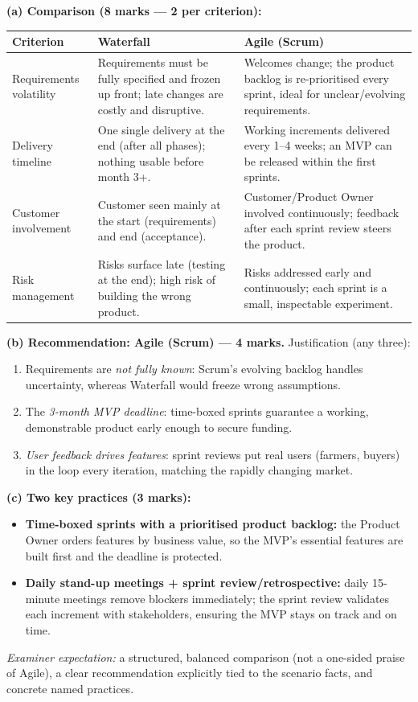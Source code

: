 \documentclass[11pt]{article}
\begin{document}
\begin{corrige}
\textbf{(a) Comparison (8 marks — 2 per criterion):}
\begin{center}
\begin{tabularx}{\linewidth}{|l|X|X|}\hline
\rowcolor{popblueL} \textbf{Criterion} & \textbf{Waterfall} & \textbf{Agile (Scrum)} \\ \hline
Requirements volatility & Requirements must be fully specified and frozen up front; late changes are costly and disruptive. & Welcomes change; the product backlog is re-prioritised every sprint, ideal for unclear/evolving requirements. \\ \hline
Delivery timeline & One single delivery at the end (after all phases); nothing usable before month 3+. & Working increments delivered every 1--4 weeks; an MVP can be released within the first sprints. \\ \hline
Customer involvement & Customer seen mainly at the start (requirements) and end (acceptance). & Customer/Product Owner involved continuously; feedback after each sprint review steers the product. \\ \hline
Risk management & Risks surface late (testing at the end); high risk of building the wrong product. & Risks addressed early and continuously; each sprint is a small, inspectable experiment. \\ \hline
\end{tabularx}
\end{center}

\textbf{(b) Recommendation: Agile (Scrum) — 4 marks.} Justification (any three):
\begin{enumerate}
    \item Requirements are \emph{not fully known}: Scrum's evolving backlog handles uncertainty, whereas Waterfall would freeze wrong assumptions.
    \item The \emph{3-month MVP deadline}: time-boxed sprints guarantee a working, demonstrable product early enough to secure funding.
    \item \emph{User feedback drives features}: sprint reviews put real users (farmers, buyers) in the loop every iteration, matching the rapidly changing market.
\end{enumerate}

\textbf{(c) Two key practices (3 marks):}
\begin{itemize}
    \item \textbf{Time-boxed sprints with a prioritised product backlog:} the Product Owner orders features by business value, so the MVP's essential features are built first and the deadline is protected.
    \item \textbf{Daily stand-up meetings + sprint review/retrospective:} daily 15-minute meetings remove blockers immediately; the sprint review validates each increment with stakeholders, ensuring the MVP stays on track and on time.
\end{itemize}
\emph{Examiner expectation:} a structured, balanced comparison (not a one-sided praise of Agile), a clear recommendation explicitly tied to the scenario facts, and concrete named practices.
\end{corrige}
\end{document}
